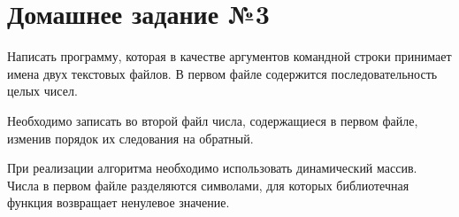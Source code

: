\section*{Домашнее задание №3}


Написать программу, которая в качестве аргументов командной строки
принимает имена двух текстовых файлов.
В первом файле содержится
последовательность целых чисел.

Необходимо записать во второй файл
числа, содержащиеся в первом файле, изменив порядок их следования на
обратный.

При реализации алгоритма необходимо использовать
динамический массив. Числа в первом файле разделяются символами, для
которых библиотечная функция  возвращает ненулевое значение.
